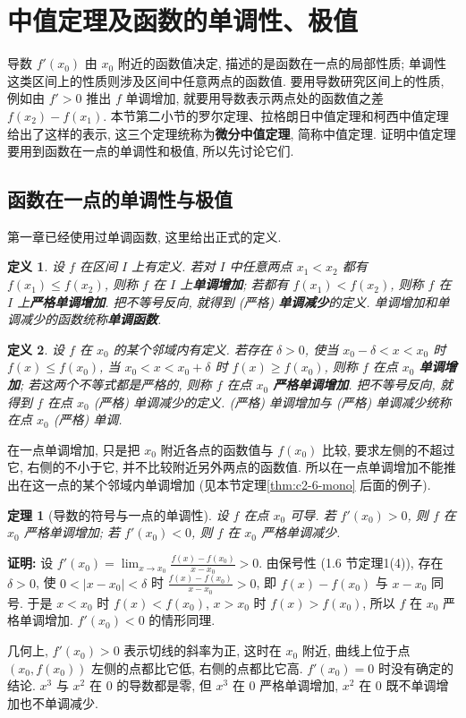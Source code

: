 \documentclass[UTF8,openany]{ctexbook}
\theoremstyle{chinesetextbook}
\newtheorem{definition}{定义}[section]
\newtheorem{theorem}{定理}[section]
\newenvironment{cnproof}{\par\indent\textbf{证明:} \ignorespaces}{\par}
\begin{document}
\section{中值定理及函数的单调性、极值}
导数 $f'(x_0)$ 由 $x_0$ 附近的函数值决定, 描述的是函数在一点的局部性质; 单调性这类区间上的性质则涉及区间中任意两点的函数值. 要用导数研究区间上的性质, 例如由 $f'>0$ 推出 $f$ 单调增加, 就要用导数表示两点处的函数值之差 $f(x_2)-f(x_1)$. 本节第二小节的罗尔定理、拉格朗日中值定理和柯西中值定理给出了这样的表示, 这三个定理统称为\textbf{微分中值定理}, 简称中值定理. 证明中值定理要用到函数在一点的单调性和极值, 所以先讨论它们.
\subsection{函数在一点的单调性与极值}
第一章已经使用过单调函数, 这里给出正式的定义.
\begin{definition}
设 $f$ 在区间 $I$ 上有定义. 若对 $I$ 中任意两点 $x_1<x_2$ 都有 $f(x_1)\le f(x_2)$, 则称 $f$ 在 $I$ 上\textbf{单调增加}; 若都有 $f(x_1)<f(x_2)$, 则称 $f$ 在 $I$ 上\textbf{严格单调增加}. 把不等号反向, 就得到 (严格) \textbf{单调减少}的定义. 单调增加和单调减少的函数统称\textbf{单调函数}.
\end{definition}
\begin{definition}
设 $f$ 在 $x_0$ 的某个邻域内有定义. 若存在 $\delta>0$, 使当 $x_0-\delta<x<x_0$ 时 $f(x)\le f(x_0)$, 当 $x_0<x<x_0+\delta$ 时 $f(x)\ge f(x_0)$, 则称 $f$ 在点 $x_0$ \textbf{单调增加}; 若这两个不等式都是严格的, 则称 $f$ 在点 $x_0$ \textbf{严格单调增加}. 把不等号反向, 就得到 $f$ 在点 $x_0$ (严格) 单调减少的定义. (严格) 单调增加与 (严格) 单调减少统称在点 $x_0$ (严格) 单调.
\end{definition}
在一点单调增加, 只是把 $x_0$ 附近各点的函数值与 $f(x_0)$ 比较, 要求左侧的不超过它, 右侧的不小于它, 并不比较附近另外两点的函数值. 所以在一点单调增加不能推出在这一点的某个邻域内单调增加 (见本节定理\ref{thm:c2-6-mono} 后面的例子).
\begin{theorem}[导数的符号与一点的单调性]\label{thm:c2-6-point}
设 $f$ 在点 $x_0$ 可导. 若 $f'(x_0)>0$, 则 $f$ 在 $x_0$ 严格单调增加; 若 $f'(x_0)<0$, 则 $f$ 在 $x_0$ 严格单调减少.
\end{theorem}
\begin{cnproof}
设 $\displaystyle f'(x_0)=\lim_{x\to x_0}\frac{f(x)-f(x_0)}{x-x_0}>0$. 由保号性 (1.6 节定理1(4)), 存在 $\delta>0$, 使 $0<|x-x_0|<\delta$ 时 $\displaystyle\frac{f(x)-f(x_0)}{x-x_0}>0$, 即 $f(x)-f(x_0)$ 与 $x-x_0$ 同号. 于是 $x<x_0$ 时 $f(x)<f(x_0)$, $x>x_0$ 时 $f(x)>f(x_0)$, 所以 $f$ 在 $x_0$ 严格单调增加. $f'(x_0)<0$ 的情形同理.
\end{cnproof}
几何上, $f'(x_0)>0$ 表示切线的斜率为正, 这时在 $x_0$ 附近, 曲线上位于点 $(x_0,f(x_0))$ 左侧的点都比它低, 右侧的点都比它高. $f'(x_0)=0$ 时没有确定的结论. $x^3$ 与 $x^2$ 在 $0$ 的导数都是零, 但 $x^3$ 在 $0$ 严格单调增加, $x^2$ 在 $0$ 既不单调增加也不单调减少.
\end{document}
